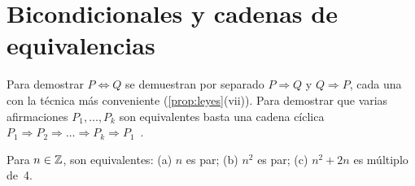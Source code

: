 \addtocounter{definicion}{1}%

\section{Bicondicionales y cadenas de equivalencias}

\begin{definicion}
Para demostrar $P\Leftrightarrow Q$ se demuestran por separado $P\Rightarrow Q$ y $Q\Rightarrow P$, cada una con la técnica más conveniente (\cref{prop:leyes}(vii)). Para demostrar que varias afirmaciones $P_1,\dots,P_k$ son equivalentes basta una cadena cíclica $P_1\Rightarrow P_2\Rightarrow\dots\Rightarrow P_k\Rightarrow P_1$~\cite[§7.2]{hammack}.
\end{definicion}

\begin{proposicion}\label{prop:par-equiv}
Para $n\in\mathbb{Z}$, son equivalentes: (a) $n$ es par; (b) $n^{2}$ es par; (c) $n^{2}+2n$ es múltiplo de~4.
\end{proposicion}

\addtocounter{definicion}{1}%

\addtocounter{definicion}{1}%

